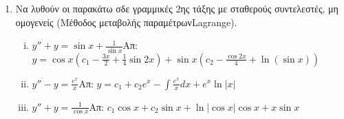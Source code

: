 \documentclass[a4paper,12pt]{article}
\begin{document}
\begin{enumerate}
\begin{enumerate}
\end{enumerate}

\item Να λυθούν οι παρακάτω σδε γραμμικές 2ης τάξης με σταθερούς συντελεστές, μη ομογενείς (Μέθοδος μεταβολής παραμέτρων\textlatin{Lagrange}).

\begin{enumerate}[i)]

\item $y''+y=\sin x +\frac{1}{\sin x}$\hfill Απ: $y=\cos x(c_1-\frac{3x}{2}+\frac{1}{4}\sin 2x)+\sin x (c_2-\frac{\cos 2x}{4}+\ln(\sin x))$
\item $y''-y=\frac{e^x}{x}$\hfill Απ: $y=c_1+c_2e^x-\int \frac{e^x}{x}dx+e^x\ln|x|$
\item $y''+y=\frac{1}{\cos x}$\hfill Απ: $c_1\cos x+c_2\sin x+\ln|\cos x|\cos x+x\sin x$

\end{enumerate}

\end{enumerate}
\end{document}
